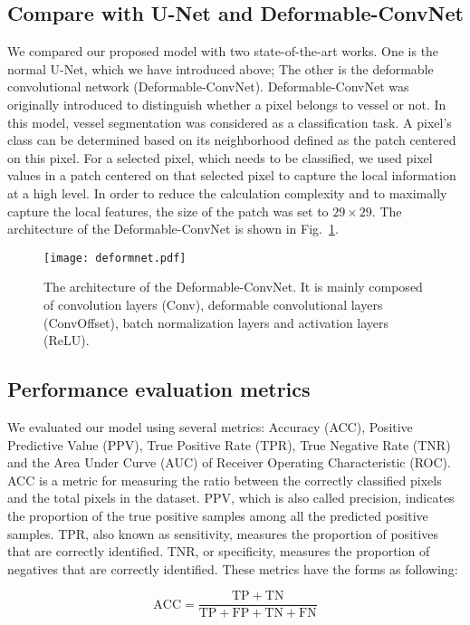 \documentclass[journal]{IEEEtran}
\begin{document}
\subsection{Compare with U-Net and Deformable-ConvNet}
We compared our proposed model with two state-of-the-art works. One is the normal U-Net, which we have introduced above; The other is the deformable convolutional network (Deformable-ConvNet). Deformable-ConvNet was originally introduced to distinguish whether a pixel belongs to vessel or not. In this model, vessel segmentation was considered as a classification task. A pixel's class can be determined based on its neighborhood defined as the patch centered on this pixel. For a selected pixel, which needs to be classified, we used pixel values in a patch centered on that selected pixel to capture the local information at a high level. In order to reduce the calculation complexity and to maximally capture the local features, the size of the patch was set to $29 \times 29$. The architecture of the Deformable-ConvNet is shown in Fig.~\ref{fig:deformnet}.

\begin{figure}
\centering
\texttt{[image: deformnet.pdf]}
\caption{The architecture of the Deformable-ConvNet. It is mainly composed of convolution layers (Conv), deformable convolutional layers (ConvOffset), batch normalization layers and activation layers (ReLU).
}
\label{fig:deformnet}
\end{figure}


\subsection{Performance evaluation metrics}
We evaluated our model using several metrics: Accuracy (ACC), Positive Predictive Value (PPV), True Positive Rate (TPR), True Negative Rate (TNR) and the Area Under Curve (AUC) of Receiver Operating Characteristic (ROC). ACC is a metric for measuring the ratio between the correctly classified pixels and the total pixels in the dataset. PPV, which is also called precision, indicates the proportion of the true positive samples among all the predicted positive samples. TPR, also known as sensitivity, measures the proportion of positives that are correctly identified. TNR, or specificity, measures the proportion of negatives that are correctly identified. These metrics have the forms as following:

\setlength{\abovedisplayshortskip}{0pt}
\setlength{\belowdisplayshortskip}{0pt}
\begin{equation}
\mathrm{ACC}=\frac{\mathrm{TP}+\mathrm{TN}}{\mathrm{TP}+\mathrm{FP}+\mathrm{TN}+\mathrm{FN}}
\label{eq:accuracy}
\end{equation}
\end{document}
